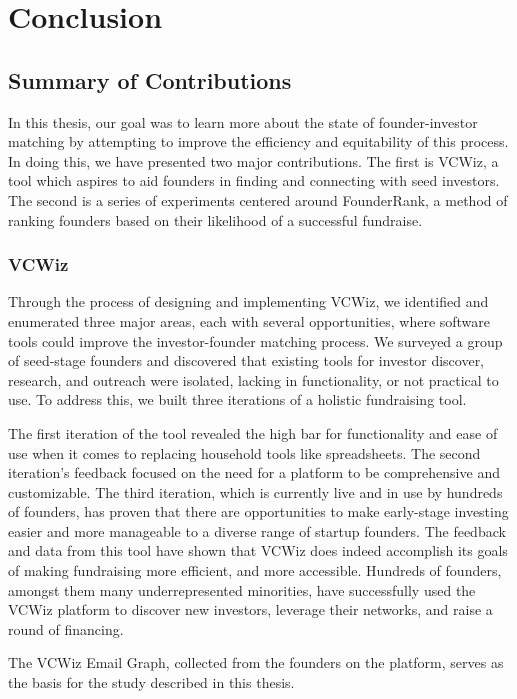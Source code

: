 \chapter{Conclusion}
\label{ch:ch6}

\section{Summary of Contributions}

In this thesis, our goal was to learn more about the state of founder-investor matching by attempting to improve the efficiency and equitability of this process. In doing this, we have presented two major contributions. The first is VCWiz, a tool which aspires to aid founders in finding and connecting with seed investors. The second is a series of experiments centered around FounderRank, a method of ranking founders based on their likelihood of a successful fundraise.

\subsection{VCWiz}

Through the process of designing and implementing VCWiz, we identified and enumerated three major areas, each with several opportunities, where software tools could improve the investor-founder matching process. We surveyed a group of seed-stage founders and discovered that existing tools for investor discover, research, and outreach were isolated, lacking in functionality, or not practical to use. To address this, we built three iterations of a holistic fundraising tool.

The first iteration of the tool revealed the high bar for functionality and ease of use when it comes to replacing household tools like spreadsheets. The second iteration's feedback focused on the need for a platform to be comprehensive and customizable. The third iteration, which is currently live and in use by hundreds of founders, has proven that there are opportunities to make early-stage investing easier and more manageable to a diverse range of startup founders. The feedback and data from this tool have shown that VCWiz does indeed accomplish its goals of making fundraising more efficient, and more accessible. Hundreds of founders, amongst them many underrepresented minorities, have successfully used the VCWiz platform to discover new investors, leverage their networks, and raise a round of financing.

The VCWiz Email Graph, collected from the founders on the platform, serves as the basis for the study described in this thesis.

